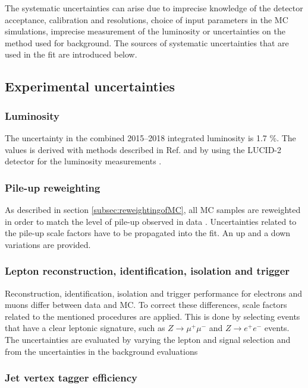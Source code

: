 The systematic uncertainties can arise due to imprecise knowledge of the detector acceptance, calibration and resolutions, choice of input parameters in the MC simulations, imprecise measurement of the luminosity or uncertainties on the method used for background. The sources of systematic uncertainties that are used in the fit are introduced below. 

\subsection{Experimental uncertainties}

\subsubsection{Luminosity}
The uncertainty in the combined 2015–2018 integrated luminosity is 1.7 \%. The values is derived with methods described in Ref. \cite{ATLAS-CONF-2019-021} and by using the LUCID-2 detector for the luminosity measurements \cite{Avoni:2018iuv}.

\subsubsection{Pile-up reweighting}

As described in section \ref{subsec:reweightingofMC}, all MC samples are reweighted in order to match the level of pile-up observed in data \cite{Marshall:2014mza}. Uncertainties related to the pile-up scale factors have to be propagated into the fit. An up and a down variations are provided.

\subsubsection{Lepton reconstruction, identification, isolation and trigger}

Reconstruction, identification, isolation and trigger performance for electrons and muons differ between data and MC. To correct these differences, scale factors related to the mentioned procedures are applied. This is done by selecting events that have a clear leptonic signature, such as $Z \rightarrow \mu^{+}\mu^{-}$ and $Z\rightarrow e^{+}e^{-}$ events. The uncertainties are evaluated by varying the lepton and signal selection and from the uncertainties in the background evaluations \cite{lep_syst12012,lep_syst2017}

\subsubsection{Jet vertex tagger efficiency}

